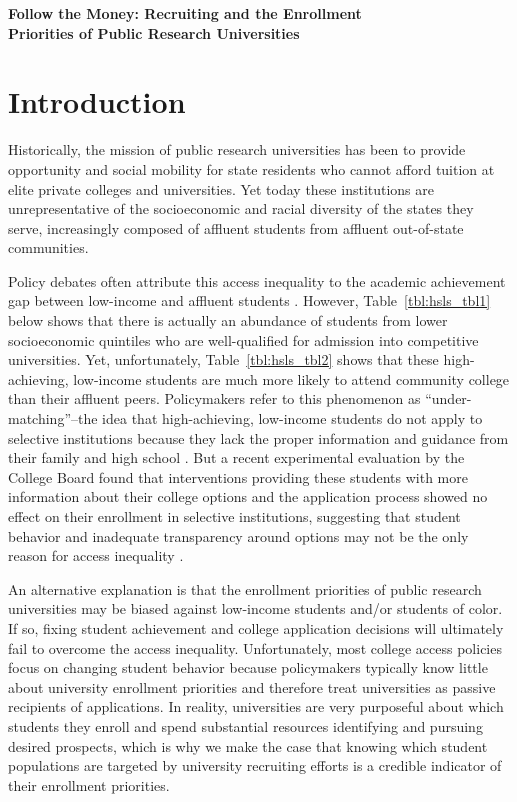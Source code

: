 \documentclass{article}
\begin{document}
\sloppy




{\LARGE\noindent\bfseries Follow the Money: Recruiting and the Enrollment \\Priorities of Public Research Universities}

\section*{Introduction}

Historically, the mission of public research universities has been to provide opportunity and social mobility for state residents who cannot afford tuition at elite private colleges and universities. Yet today these institutions are unrepresentative of the socioeconomic and racial diversity of the states they serve, increasingly composed of affluent students from affluent out-of-state communities.

Policy debates often attribute this access inequality to the academic achievement gap between low-income and affluent students \citep{RN4016}. However, Table~\ref{tbl:hsls_tbl1} below shows that there is actually an abundance of students from lower socioeconomic quintiles who are well-qualified for admission into competitive universities. Yet, unfortunately, Table~\ref{tbl:hsls_tbl2} shows that these high-achieving, low-income students are much more likely to attend community college than their affluent peers. Policymakers refer to this phenomenon as ``under-matching''--the idea that high-achieving, low-income students do not apply to selective institutions because they lack the proper information and guidance from their family and high school \citep{RN3699}. But a recent experimental evaluation by the College Board found that interventions providing these students with more information about their college options and the application process showed no effect on their enrollment in selective institutions, suggesting that student behavior and inadequate transparency around options may not be the only reason for access inequality \citep{RN4468}.

An alternative explanation is that the enrollment priorities of public research universities may be biased against low-income students and/or students of color. If so, fixing student achievement and college application decisions will ultimately fail to overcome the access inequality. Unfortunately, most college access policies focus on changing student behavior because policymakers typically know little about university enrollment priorities and therefore treat universities as passive recipients of applications. In reality, universities are very purposeful about which students they enroll and spend substantial resources identifying and pursuing desired prospects, which is why we make the case that knowing which student populations are targeted by university recruiting efforts is a credible indicator of their enrollment priorities. 
\end{document}
